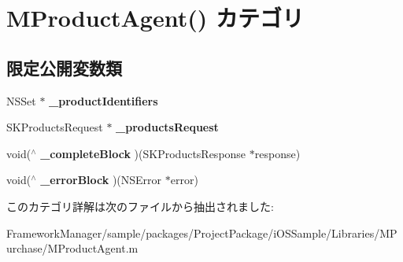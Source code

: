 \hypertarget{category_m_product_agent_07_08}{}\section{M\+Product\+Agent() カテゴリ}
\label{category_m_product_agent_07_08}
\subsection*{限定公開変数類}
\begin{DoxyCompactItemize}
\item 
\hypertarget{category_m_product_agent_07_08_adb6bd122dc4e16dde7be9ad392f89d55}{}N\+S\+Set $\ast$ {\bfseries \+\_\+product\+Identifiers}\label{category_m_product_agent_07_08_adb6bd122dc4e16dde7be9ad392f89d55}

\item 
\hypertarget{category_m_product_agent_07_08_acb0a09c0cf8904d2867d3e215f521fd7}{}S\+K\+Products\+Request $\ast$ {\bfseries \+\_\+products\+Request}\label{category_m_product_agent_07_08_acb0a09c0cf8904d2867d3e215f521fd7}

\item 
\hypertarget{category_m_product_agent_07_08_af951cb1c6692d297ee958d4a38dfb941}{}void($^\wedge$ {\bfseries \+\_\+complete\+Block} )(S\+K\+Products\+Response $\ast$response)\label{category_m_product_agent_07_08_af951cb1c6692d297ee958d4a38dfb941}

\item 
\hypertarget{category_m_product_agent_07_08_a5b3efc52aa0a0a2e8101749c8503d460}{}void($^\wedge$ {\bfseries \+\_\+error\+Block} )(N\+S\+Error $\ast$error)\label{category_m_product_agent_07_08_a5b3efc52aa0a0a2e8101749c8503d460}

\end{DoxyCompactItemize}


このカテゴリ詳解は次のファイルから抽出されました\+:\begin{DoxyCompactItemize}
\item 
Framework\+Manager/sample/packages/\+Project\+Package/i\+O\+S\+Sample/\+Libraries/\+M\+Purchase/M\+Product\+Agent.\+m\end{DoxyCompactItemize}
